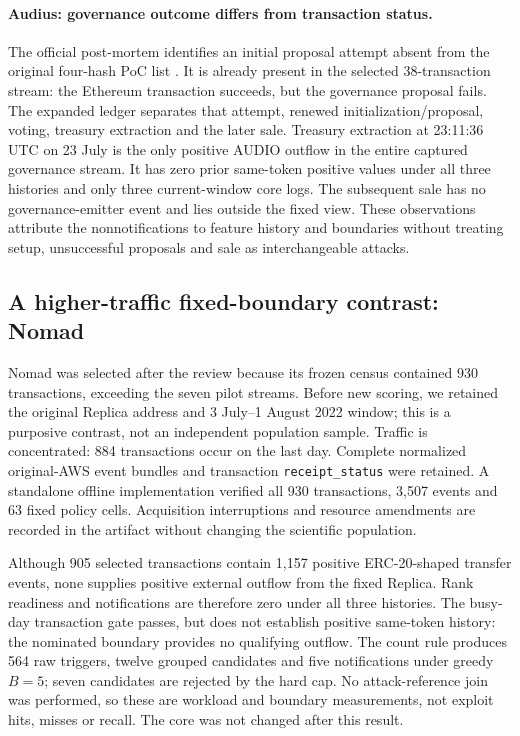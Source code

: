 \documentclass[preprint,12pt,authoryear]{elsarticle}
\begin{document}
\paragraph{Audius: governance outcome differs from transaction status.}
The official post-mortem identifies an initial proposal attempt absent from the original four-hash PoC list \citep{Audius2022Report}. It is already present in the selected 38-transaction stream: the Ethereum transaction succeeds, but the governance proposal fails. The expanded ledger separates that attempt, renewed initialization/proposal, voting, treasury extraction and the later sale. Treasury extraction at 23:11:36 UTC on 23 July is the only positive AUDIO outflow in the entire captured governance stream. It has zero prior same-token positive values under all three histories and only three current-window core logs. The subsequent sale has no governance-emitter event and lies outside the fixed view. These observations attribute the nonnotifications to feature history and boundaries without treating setup, unsuccessful proposals and sale as interchangeable attacks.

\subsection{A higher-traffic fixed-boundary contrast: Nomad}\label{sec:nomad}
Nomad was selected after the review because its frozen census contained 930 transactions, exceeding the seven pilot streams. Before new scoring, we retained the original Replica address and 3 July--1 August 2022 window; this is a purposive contrast, not an independent population sample. Traffic is concentrated: 884 transactions occur on the last day. Complete normalized original-AWS event bundles and transaction \texttt{receipt\_status} were retained. A standalone offline implementation verified all 930 transactions, 3,507 events and 63 fixed policy cells. Acquisition interruptions and resource amendments are recorded in the artifact without changing the scientific population.

Although 905 selected transactions contain 1,157 positive ERC-20-shaped transfer events, none supplies positive external outflow from the fixed Replica. Rank readiness and notifications are therefore zero under all three histories. The busy-day transaction gate passes, but does not establish positive same-token history: the nominated boundary provides no qualifying outflow. The count rule produces 564 raw triggers, twelve grouped candidates and five notifications under greedy $B=5$; seven candidates are rejected by the hard cap. No attack-reference join was performed, so these are workload and boundary measurements, not exploit hits, misses or recall. The core was not changed after this result.
\end{document}
